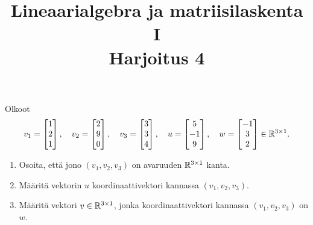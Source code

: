\documentclass[11pt,a4paper]{amsart}
\title{Lineaarialgebra ja matriisilaskenta I\\Harjoitus 4}
\author{}
\date{}
\begin{document}

\begin{exercise}
  Olkoot
  \[
    v_1 =
    \begin{bmatrix}1 \\ 2 \\ 1
    \end{bmatrix},\quad
    v_2 =
    \begin{bmatrix}2 \\ 9 \\ 0
    \end{bmatrix},\quad
    v_3 =
    \begin{bmatrix}3 \\ 3 \\ 4
    \end{bmatrix},\quad
    u =
    \begin{bmatrix}5 \\ -1 \\ 9
    \end{bmatrix},\quad
    w =
    \begin{bmatrix}-1 \\ 3 \\ 2
    \end{bmatrix}
    \in\mathbb{R}^{3\times 1}.
  \]
  \begin{enumerate}[label=(\alph*), leftmargin=*]
    \item Osoita, että jono \((v_1,v_2,v_3)\) on avaruuden
      \(\mathbb{R}^{3\times 1}\) kanta.
    \item Määritä vektorin \(u\) koordinaattivektori kannassa
      \((v_1,v_2,v_3)\).
    \item Määritä vektori \(v\in\mathbb{R}^{3\times 1}\), jonka
      koordinaattivektori kannassa \((v_1,v_2,v_3)\) on \(w\).
  \end{enumerate}
\end{exercise}
\end{document}

